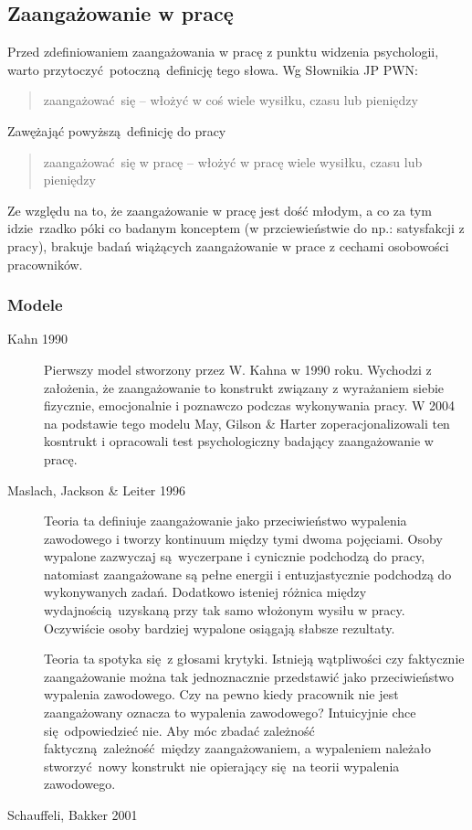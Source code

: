 \subsection{Zaangażowanie w pracę}
Przed zdefiniowaniem zaangażowania w pracę z punktu widzenia psychologii, warto przytoczyć potoczną definicję tego słowa. Wg Słownikia JP PWN:
\begin{quote}
zaangażować się -- włożyć w coś wiele wysiłku, czasu lub pieniędzy
\end{quote}
Zawężająć powyższą definicję do pracy
\begin{quote}
zaangażować się w pracę -- włożyć w pracę wiele wysiłku, czasu lub pieniędzy
\end{quote}

Ze względu na to, że zaangażowanie w pracę jest dość młodym, a co za tym idzie rzadko póki co badanym konceptem (w przciewieństwie do np.: satysfakcji z pracy), brakuje badań wiążących zaangażowanie w prace z cechami osobowości pracowników.
\subsubsection{Modele}
\begin{description}
\item[Kahn 1990]
Pierwszy model stworzony przez W. Kahna w 1990  roku. Wychodzi z założenia, że zaangażowanie to konstrukt związany z wyrażaniem siebie fizycznie, emocjonalnie i poznawczo podczas wykonywania pracy. W 2004 na podstawie tego modelu May, Gilson \& Harter zoperacjonalizowali ten kosntrukt i opracowali test psychologiczny badający zaangażowanie w pracę.
\item[Maslach, Jackson \& Leiter 1996]
Teoria ta definiuje zaangażowanie jako przeciwieństwo wypalenia zawodowego i tworzy kontinuum między tymi dwoma pojęciami. Osoby wypalone zazwyczaj są wyczerpane i cynicznie podchodzą do pracy, natomiast zaangażowane są pełne energii i entuzjastycznie podchodzą do wykonywanych zadań. Dodatkowo isteniej różnica między wydajnością uzyskaną przy tak samo włożonym wysiłu w pracy. Oczywiście osoby bardziej wypalone osiągają słabsze rezultaty.

Teoria ta spotyka się z głosami krytyki. Istnieją wątpliwości czy faktycznie zaangażowanie można tak jednoznacznie przedstawić jako przeciwieństwo wypalenia zawodowego. Czy na pewno kiedy pracownik nie jest zaangażowany oznacza to wypalenia zawodowego? Intuicyjnie chce się odpowiedzieć nie. Aby móc zbadać zależność faktyczną zależność między zaangażowaniem, a wypaleniem należało stworzyć nowy konstrukt nie opierający się na teorii wypalenia zawodowego.
\item[Schauffeli, Bakker 2001]
\end{description}



